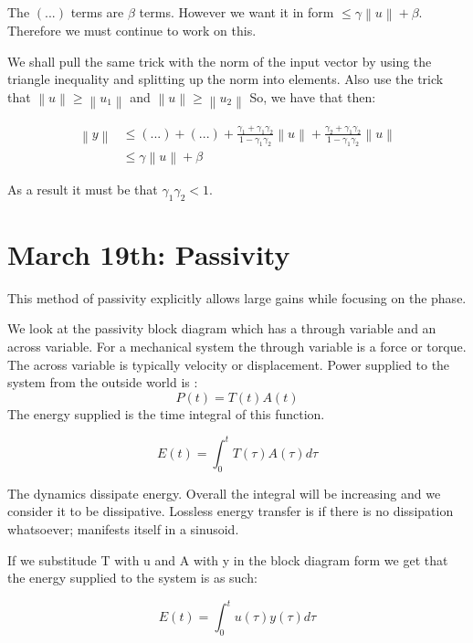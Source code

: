 \documentclass[11pt]{article}
\newcommand{\norm}[1]{\left\lVert#1\right\rVert}
\begin{document}
The $(...)$ terms are $\beta$ terms. However we want it in form $\leq \gamma\norm{u} + \beta$. Therefore we must continue to work on this.

We shall pull the same trick with the norm of the input vector by using the triangle inequality and splitting up the norm into elements. Also use the trick that $\norm{u} \geq \norm{u_1}$ and $\norm{u} \geq \norm{u_2}$  So, we have that then:

\begin{align}
	\norm{y} & \leq (...) + (...) + \frac{\gamma_1 +\gamma_1\gamma_2}{1-\gamma_1\gamma_2}\norm{u} + \frac{\gamma_2 +\gamma_1\gamma_2}{1-\gamma_1\gamma_2}\norm{u} \\
	& \leq \gamma \norm{u} + \beta
\end{align}

As a result it must be that $\gamma_1 \gamma_2 < 1$.






\section*{March 19th: Passivity}
This method of passivity explicitly allows large gains while focusing on the phase.

We look at the passivity block diagram which has a through variable and an across variable.  For a mechanical system the through variable is a force or torque. The across variable is typically velocity or displacement. Power supplied to the system from the outside world is :
\begin{equation}
P(t) = T(t)A(t)
\end{equation}
The energy supplied is the time integral of this function.

\begin{equation}
E(t) = \int_0^t T(\tau)A(\tau) d\tau
\end{equation}

The dynamics dissipate energy. Overall the integral will be increasing and we consider it to be dissipative. Lossless energy transfer is if there is no dissipation whatsoever; manifests itself in a sinusoid.

If we substitude T with u and A with y in the block diagram form we get that the energy supplied to the system is as such:
 
 \begin{equation}
E(t) = \int_0^t u(\tau)y(\tau) d\tau
\end{equation}
\end{document}
